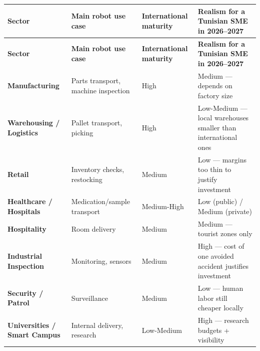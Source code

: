 {\small
\setlength{\tabcolsep}{5pt}
\renewcommand{\arraystretch}{1.3}
\begin{longtable}{|>{\centering\arraybackslash}m{2.7cm}|
                  >{\raggedright\arraybackslash}m{3.3cm}|
                  >{\centering\arraybackslash}m{2.6cm}|
                  >{\raggedright\arraybackslash}m{5.6cm}|}
\hline
\rowcolor{gray!15}
\textbf{Sector} & \textbf{Main robot use case} & \textbf{International maturity} & \textbf{Realism for a Tunisian SME in 2026–2027} \\
\hline
\endfirsthead
\hline
\rowcolor{gray!15}
\textbf{Sector} & \textbf{Main robot use case} & \textbf{International maturity} & \textbf{Realism for a Tunisian SME in 2026–2027} \\
\hline
\endhead
\hline
\endfoot
\textbf{Manufacturing} & Parts transport, machine inspection & High & Medium — depends on factory size \\
\hline
\textbf{Warehousing / Logistics} & Pallet transport, picking & High & Low-Medium — local warehouses smaller than international ones \\
\hline
\textbf{Retail} & Inventory checks, restocking & Medium & Low — margins too thin to justify investment \\
\hline
\textbf{Healthcare / Hospitals} & Medication/sample transport & Medium-High & Low (public) / Medium (private) \\
\hline
\textbf{Hospitality} & Room delivery & Medium & Medium — tourist zones only \\
\hline
\textbf{Industrial Inspection} & Monitoring, sensors & Medium & High — cost of one avoided accident justifies investment \\
\hline
\textbf{Security / Patrol} & Surveillance & Medium & Low — human labor still cheaper locally \\
\hline
\textbf{Universities / Smart Campus} & Internal delivery, research & Low-Medium & High — research budgets + visibility \\
\hline
\end{longtable}
}
